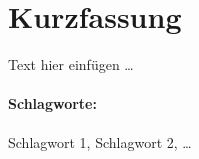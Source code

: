 \section*{Kurzfassung}\thispagestyle{empty}
    \label{chap:kurzfassung}

    Text hier einfügen \dots
    
    \vfill
\paragraph*{Schlagworte:} Schlagwort 1, Schlagwort 2, \dots
